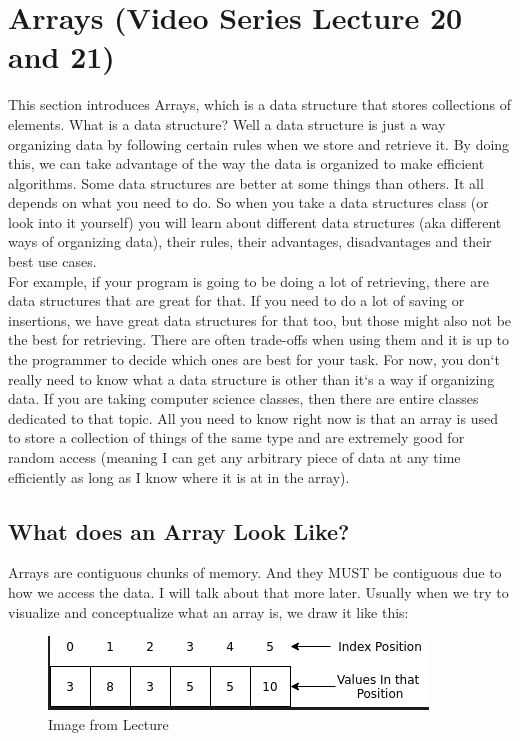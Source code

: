 \documentclass[11]{article}
\begin{document}
\section{Arrays (Video Series Lecture 20 and 21)}
This section introduces Arrays, which is a data structure that stores collections of elements. What is a data structure? Well a data structure is just a way organizing data by following certain rules when we store and retrieve it. By doing this, we can take advantage of the way the data is organized to make efficient algorithms. Some data structures are better at some things than others. It all depends on what you need to do. So when you take a data structures class (or look into it yourself) you will learn about different data structures (aka different ways of organizing data), their rules, their advantages, disadvantages and their best use cases.\\

For example, if your program is going to be doing a lot of retrieving, there are data structures that are great for that. If you need to do a lot of saving or insertions, we have great data structures for that too, but those might also not be the best for retrieving. There are often trade-offs when using them and it is up to the programmer to decide which ones are best for your task. For now, you don`t really need to know what a data structure is other than it`s a way if organizing data. If you are taking computer science classes, then there are entire classes dedicated to that topic. All you need to know right now is that an array is used to store a collection of things of the same type and are extremely good for random access (meaning I can get any arbitrary piece of data at any time efficiently as long as I know where it is at in the array).
\subsection{What does an Array Look Like?}
Arrays are contiguous chunks of memory. And they MUST be contiguous due to how we access the data. I will talk about that more later. Usually when we try to visualize and conceptualize what an array is, we draw it like this:\\

\begin{figure}[H]
	\centering
	\includegraphics[scale=0.5]{arrays1.png}
	\caption{Image from Lecture}
\end{figure}
\end{document}
